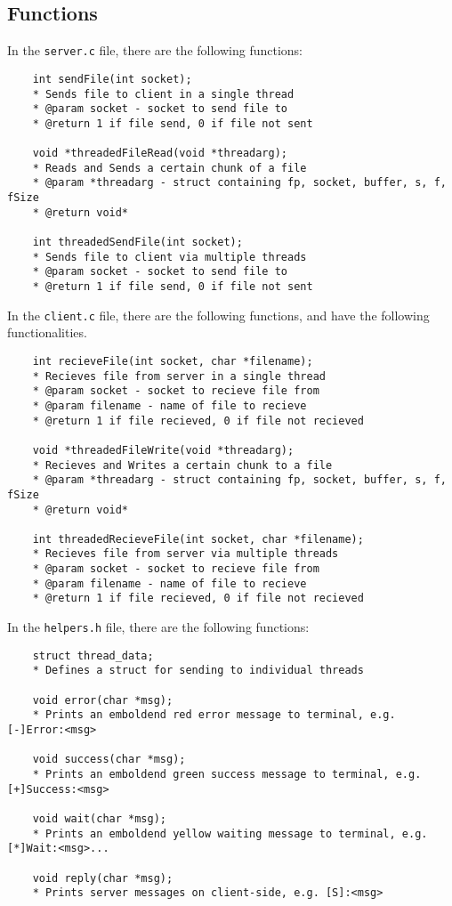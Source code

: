 \documentclass{article}
\begin{document}
\subsection{Functions}
In the \texttt{server.c} file, there are the following functions:
\begin{verbatim}
    int sendFile(int socket);
    * Sends file to client in a single thread
    * @param socket - socket to send file to
    * @return 1 if file send, 0 if file not sent

    void *threadedFileRead(void *threadarg);
    * Reads and Sends a certain chunk of a file
    * @param *threadarg - struct containing fp, socket, buffer, s, f, fSize
    * @return void*

    int threadedSendFile(int socket);
    * Sends file to client via multiple threads
    * @param socket - socket to send file to
    * @return 1 if file send, 0 if file not sent
\end{verbatim}
In the \texttt{client.c} file, there are the following functions, and have the following functionalities.
\begin{verbatim}
    int recieveFile(int socket, char *filename);
    * Recieves file from server in a single thread
    * @param socket - socket to recieve file from
    * @param filename - name of file to recieve
    * @return 1 if file recieved, 0 if file not recieved
    
    void *threadedFileWrite(void *threadarg);
    * Recieves and Writes a certain chunk to a file
    * @param *threadarg - struct containing fp, socket, buffer, s, f, fSize
    * @return void*
    
    int threadedRecieveFile(int socket, char *filename);
    * Recieves file from server via multiple threads
    * @param socket - socket to recieve file from
    * @param filename - name of file to recieve
    * @return 1 if file recieved, 0 if file not recieved
\end{verbatim}
In the \texttt{helpers.h} file, there are the following functions:
\begin{verbatim}
    struct thread_data;
    * Defines a struct for sending to individual threads
    
    void error(char *msg);
    * Prints an emboldend red error message to terminal, e.g. [-]Error:<msg>
    
    void success(char *msg);
    * Prints an emboldend green success message to terminal, e.g. [+]Success:<msg>
    
    void wait(char *msg);
    * Prints an emboldend yellow waiting message to terminal, e.g. [*]Wait:<msg>...
    
    void reply(char *msg);
    * Prints server messages on client-side, e.g. [S]:<msg>
\end{verbatim}
\end{document}
